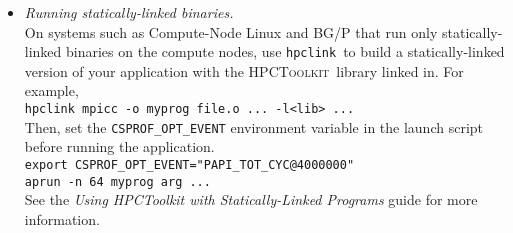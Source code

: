 \documentclass[10pt]{article}
\newcommand{\HPCToolkit}{\textsc{HPCToolkit}}
\newcommand{\hpclink}{\texttt{hpclink}}
\begin{document}
\begin{itemize}
\item{ \em Running statically-linked binaries.} \\
On systems such as Compute-Node Linux and BG/P that run only
statically-linked binaries on the compute nodes, use \hpclink\ to
build a statically-linked version of your application with the
\HPCToolkit\ library linked in.  For example, \\
\lindent
\verb|hpclink mpicc -o myprog file.o ... -l<lib> ...| \\[1ex]
Then, set the {\tt CSPROF\_OPT\_EVENT} environment variable in the
launch script before running the application. \\
\lindent
\verb|export CSPROF_OPT_EVENT="PAPI_TOT_CYC@4000000"| \\
\lindent
\verb|aprun -n 64 myprog arg ...| \\[1ex]
See the {\it Using {\sc HPCToolkit} with Statically-Linked Programs} guide
for more information.


\end{itemize}
\end{document}
